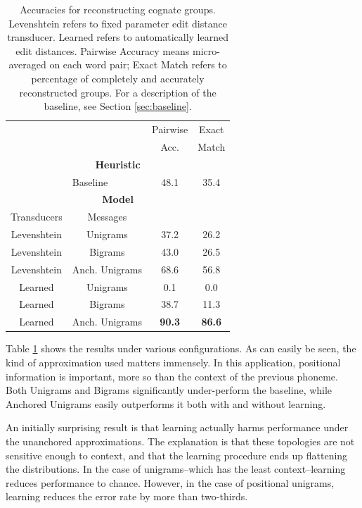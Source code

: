 \documentclass[11pt,a4paper]{article}
\begin{document}
\begin{table}
  \small
  { 
  \begin{tabular}{|c|c|c|c|}
    \cline{3-4} 
    \multicolumn{2}{c|}{} & Pairwise & Exact \\
    \multicolumn{2}{c|}{} & Acc. & Match \\
    \hline 
    \multicolumn{4}{|c|}{\textbf{Heuristic}} \\
    \hline
    \multicolumn{1}{|c}{} & \multicolumn{1}{l|}{Baseline} & 48.1 & 35.4  \\
    \hline
    \hline
    \multicolumn{4}{|c|}{\textbf{Model}} \\
    \hline
    Transducers & Messages & \multicolumn{2}{c}{} \\
    \hline
    Levenshtein&Unigrams & 37.2 & 26.2 \\
    Levenshtein&Bigrams & 43.0 & 26.5 \\
    Levenshtein&Anch. Unigrams & 68.6 & 56.8\\
    Learned&Unigrams & 0.1 & 0.0 \\
    Learned&Bigrams & 38.7 & 11.3 \\
    Learned&Anch. Unigrams & \textbf{90.3}  & \textbf{86.6} \\
    \hline
  \end{tabular}
  \caption{Accuracies for reconstructing cognate groups. Levenshtein
  refers to fixed parameter edit distance transducer. Learned refers
  to automatically learned edit distances. Pairwise Accuracy means micro-averaged
  on each word pair; Exact Match refers to percentage of completely and accurately
  reconstructed groups. For a description of the baseline, see Section \ref{sec:baseline}. }
  \label{tbl:exp1}
 }
\end{table}

Table \ref{tbl:exp1} shows the results under various configurations.
As can easily be seen, the kind of approximation used matters
immensely. In this application, positional information is important,
more so than the context of the previous phoneme. Both Unigrams and
Bigrams significantly under-perform the baseline, while Anchored
Unigrams easily outperforms it both with and without learning.

An initially surprising result is that learning actually harms
performance under the unanchored approximations. The explanation
is that these topologies are not sensitive enough to context, and
that the learning procedure ends up flattening the distributions.
In the case of unigrams--which has the least context--learning
reduces performance to chance. However, in the case of positional
unigrams, learning reduces the error rate by more than two-thirds.
\end{document}
